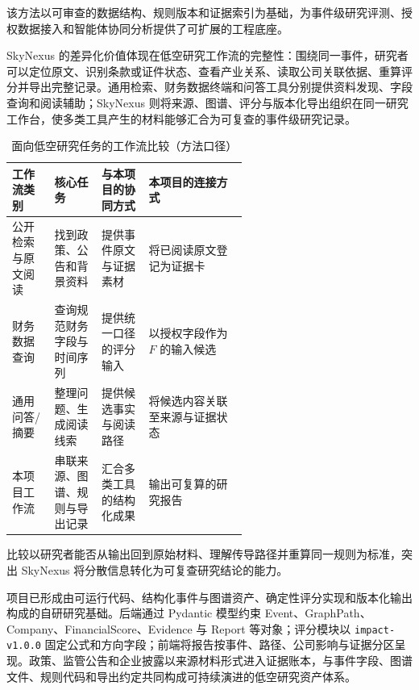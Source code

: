 该方法以可审查的数据结构、规则版本和证据索引为基础，为事件级研究评测、授权数据接入和智能体协同分析提供了可扩展的工程底座。


SkyNexus 的差异化价值体现在低空研究工作流的完整性：围绕同一事件，研究者可以定位原文、识别条款或证件状态、查看产业关系、读取公司关联依据、重算评分并导出完整记录。通用检索、财务数据终端和问答工具分别提供资料发现、字段查询和阅读辅助；SkyNexus 则将来源、图谱、评分与版本化导出组织在同一研究工作台，使多类工具产生的材料能够汇合为可复查的事件级研究记录。

\begin{table}[!htbp]
\centering
\caption{面向低空研究任务的工作流比较（方法口径）}
\label{tab:wty-workflow-comparison}
\small
\begin{tabularx}{\linewidth}{p{0.18\linewidth}p{0.20\linewidth}p{0.20\linewidth}X}
\toprule
工作流类别 & 核心任务 & 与本项目的协同方式 & 本项目的连接方式 \\
\midrule
公开检索与原文阅读 & 找到政策、公告和背景资料 & 提供事件原文与证据素材 & 将已阅读原文登记为证据卡 \\
财务数据查询 & 查询规范财务字段与时间序列 & 提供统一口径的评分输入 & 以授权字段作为 $F$ 的输入候选 \\
通用问答/摘要 & 整理问题、生成阅读线索 & 提供候选事实与阅读路径 & 将候选内容关联至来源与证据状态 \\
本项目工作流 & 串联来源、图谱、规则与导出记录 & 汇合多类工具的结构化成果 & 输出可复算的研究报告 \\
\bottomrule
\end{tabularx}
\end{table}

比较以研究者能否从输出回到原始材料、理解传导路径并重算同一规则为标准，突出 SkyNexus 将分散信息转化为可复查研究结论的能力。


项目已形成由可运行代码、结构化事件与图谱资产、确定性评分实现和版本化输出构成的自研研究基础。后端通过 Pydantic 模型约束 Event、GraphPath、Company、FinancialScore、Evidence 与 Report 等对象；评分模块以 \texttt{impact-v1.0.0} 固定公式和方向字段；前端将报告按事件、路径、公司影响与证据分区呈现。政策、监管公告和企业披露以来源材料形式进入证据账本，与事件字段、图谱文件、规则代码和导出约定共同构成可持续演进的低空研究资产体系。

